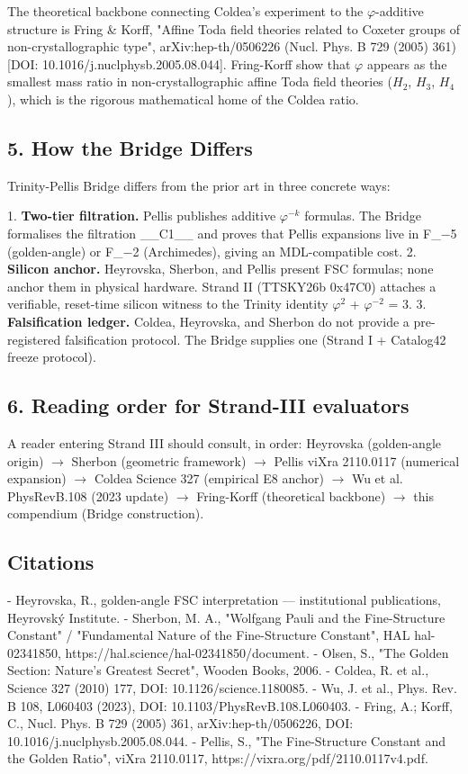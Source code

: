 The theoretical backbone connecting Coldea's experiment to the $\varphi$-additive structure is Fring \& Korff, "Affine Toda field theories related to Coxeter groups of non-crystallographic type", arXiv:hep-th/0506226 (Nucl. Phys. B 729 (2005) 361) [DOI: 10.1016/j.nuclphysb.2005.08.044]. Fring-Korff show that $\varphi$ appears as the smallest mass ratio in non-crystallographic affine Toda field theories ($H_{2}$, $H_{3}$, $H_{4}$), which is the rigorous mathematical home of the Coldea ratio.

\subsection{5. How the Bridge Differs}

Trinity-Pellis Bridge differs from the prior art in three concrete ways:

1. \textbf{Two-tier filtration.} Pellis publishes additive $\varphi^{-k}$ formulas. The Bridge formalises the filtration \_\_C1\_\_ and proves that Pellis expansions live in F\_{$-$5} (golden-angle) or F\_{$-$2} (Archimedes), giving an MDL-compatible cost.
2. \textbf{Silicon anchor.} Heyrovska, Sherbon, and Pellis present FSC formulas; none anchor them in physical hardware. Strand II (TTSKY26b 0x47C0) attaches a verifiable, reset-time silicon witness to the Trinity identity $\varphi^{2}$ + $\varphi^{-2}$ = 3.
3. \textbf{Falsification ledger.} Coldea, Heyrovska, and Sherbon do not provide a pre-registered falsification protocol. The Bridge supplies one (Strand I + Catalog42 freeze protocol).

\subsection{6. Reading order for Strand-III evaluators}

A reader entering Strand III should consult, in order: Heyrovska (golden-angle origin) $\rightarrow$ Sherbon (geometric framework) $\rightarrow$ Pellis viXra 2110.0117 (numerical expansion) $\rightarrow$ Coldea Science 327 (empirical E8 anchor) $\rightarrow$ Wu et al. PhysRevB.108 (2023 update) $\rightarrow$ Fring-Korff (theoretical backbone) $\rightarrow$ this compendium (Bridge construction).

\subsection{Citations}

- Heyrovska, R., golden-angle FSC interpretation --- institutional publications, Heyrovský Institute.
- Sherbon, M. A., "Wolfgang Pauli and the Fine-Structure Constant" / "Fundamental Nature of the Fine-Structure Constant", HAL hal-02341850, https://hal.science/hal-02341850/document.
- Olsen, S., "The Golden Section: Nature's Greatest Secret", Wooden Books, 2006.
- Coldea, R. et al., Science 327 (2010) 177, DOI: 10.1126/science.1180085.
- Wu, J. et al., Phys. Rev. B 108, L060403 (2023), DOI: 10.1103/PhysRevB.108.L060403.
- Fring, A.; Korff, C., Nucl. Phys. B 729 (2005) 361, arXiv:hep-th/0506226, DOI: 10.1016/j.nuclphysb.2005.08.044.
- Pellis, S., "The Fine-Structure Constant and the Golden Ratio", viXra 2110.0117, https://vixra.org/pdf/2110.0117v4.pdf.
